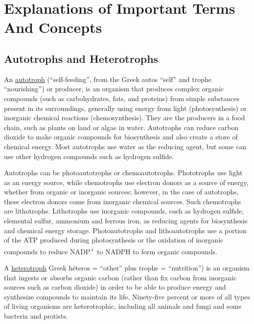 \chapter{Explanations of Important Terms And
Concepts}\label{explanations-of-important-terms-and-concepts}

\section{Autotrophs and Heterotrophs}\label{autotrophs-and-heterotrophs}

An \href{https://en.wikipedia.org/wiki/Autotroph}{autotroph}
(``self-feeding'', from the Greek autos ``self'' and trophe
``nourishing'') or producer, is an organism that produces complex
organic compounds (such as carbohydrates, fats, and proteins) from
simple substances present in its surroundings, generally using energy
from light (photosynthesis) or inorganic chemical reactions
(chemosynthesis). They are the producers in a food chain, such as plants
on land or algae in water. Autotrophs can reduce carbon dioxide to make
organic compounds for biosynthesis and also create a store of chemical
energy. Most autotrophs use water as the reducing agent, but some can
use other hydrogen compounds such as hydrogen sulfide.

Autotrophs can be photoautotrophs or chemoautotrophs. Phototrophs use
light as an energy source, while chemotrophs use electron donors as a
source of energy, whether from organic or inorganic sources; however, in
the case of autotrophs, these electron donors come from inorganic
chemical sources. Such chemotrophs are lithotrophs. Lithotrophs use
inorganic compounds, such as hydrogen sulfide, elemental sulfur,
ammonium and ferrous iron, as reducing agents for biosynthesis and
chemical energy storage. Photoautotrophs and lithoautotrophs use a
portion of the ATP produced during photosynthesis or the oxidation of
inorganic compounds to reduce NADP\textsuperscript{+} to NADPH to form organic compounds.

A \href{https://en.wikipedia.org/wiki/Heterotroph}{heterotroph} Greek
héteros = ``other'' plus trophe = ``nutrition'') is an organism that
ingests or absorbs organic carbon (rather than fix carbon from inorganic
sources such as carbon dioxide) in order to be able to produce energy
and synthesize compounds to maintain its life. Ninety-five percent or
more of all types of living organisms are heterotrophic, including all
animals and fungi and some bacteria and protists.

